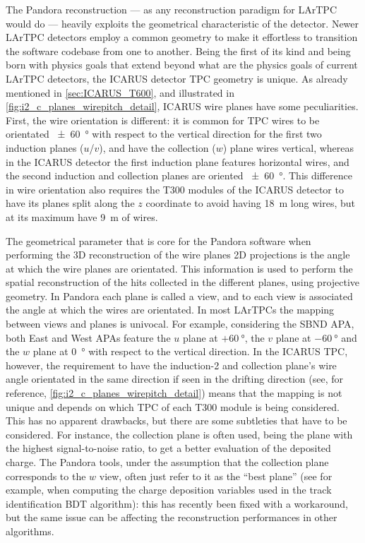 The Pandora reconstruction --- as any reconstruction paradigm for LArTPC would do --- heavily exploits the geometrical characteristic of the detector. Newer LArTPC detectors employ a common geometry to make it effortless to transition the software codebase from one to another. Being the first of its kind and being born with physics goals that extend beyond what are the physics goals of current LArTPC detectors, the ICARUS detector TPC geometry is unique. As already mentioned in \autoref{sec:ICARUS_T600}, and illustrated in \autoref{fig:i2_c_planes_wirepitch_detail}, ICARUS wire planes have some peculiarities. First, the wire orientation is different: it is common for TPC wires to be orientated \SI{+-60}{\degree} with respect to the vertical direction for the first two induction planes ($u$/$v$), and have the collection ($w$) plane wires vertical, whereas in the ICARUS detector the first induction plane features horizontal wires, and the second induction and collection planes are oriented \SI{+-60}{\degree}. This difference in wire orientation also requires the T300 modules of the ICARUS detector to have its planes split along the $z$ coordinate to avoid having \SI{18}{\meter} long wires, but at its maximum have \SI{9}{\meter} of wires. 

The geometrical parameter that is core for the Pandora software when performing the 3D reconstruction of the wire planes 2D projections is the angle at which the wire planes are orientated. This information is used to perform the spatial reconstruction of the hits collected in the different planes, using projective geometry. In Pandora each plane is called a view, and to each view is associated the angle at which the wires are orientated. In most LArTPCs the mapping between views and planes is univocal. For example, considering the SBND APA, both East and West APAs feature the $u$ plane at $+\SI{60}{\degree}$, the $v$ plane at $-\SI{60}{\degree}$ and the $w$ plane at \SI{0}{\degree} with respect to the vertical direction. In the ICARUS TPC, however, the requirement to have the induction-2 and collection plane's wire angle orientated in the same direction if seen in the drifting direction (see, for reference, \autoref{fig:i2_c_planes_wirepitch_detail}) means that the mapping is not unique and depends on which TPC of each T300 module is being considered. This has no apparent drawbacks, but there are some subtleties that have to be considered. For instance, the collection plane is often used, being the plane with the highest signal-to-noise ratio, to get a better evaluation of the deposited charge. The Pandora tools, under the assumption that the collection plane corresponds to the $w$ view, often just refer to it as the ``best plane'' (see for example, when computing the charge deposition variables used in the track identification BDT algorithm): this has recently been fixed with a workaround, but the same issue can be affecting the reconstruction performances in other algorithms. 

